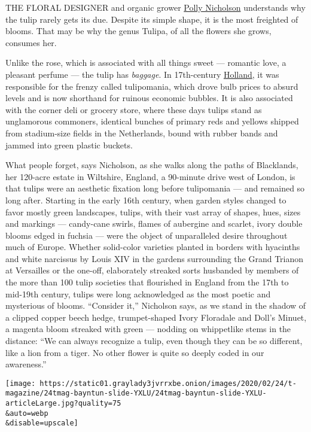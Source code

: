 THE FLORAL DESIGNER and organic grower
\href{https://www.bayntunflowers.co.uk/pages/polly-nicholson}{Polly
Nicholson} understands why the tulip rarely gets its due. Despite its
simple shape, it is the most freighted of blooms. That may be why the
genus Tulipa, of all the flowers she grows, consumes her.

Unlike the rose, which is associated with all things sweet --- romantic
love, a pleasant perfume --- the tulip has \emph{baggage}. In
17th-century
\href{https://www.nytimes3xbfgragh.onion/2007/05/13/travel/09tulipswebonly2.html}{Holland},
it was responsible for the frenzy called tulipomania, which drove bulb
prices to absurd levels and is now shorthand for ruinous economic
bubbles. It is also associated with the corner deli or grocery store,
where these days tulips stand as unglamorous commoners, identical
bunches of primary reds and yellows shipped from stadium-size fields in
the Netherlands, bound with rubber bands and jammed into green plastic
buckets.

What people forget, says Nicholson, as she walks along the paths of
Blacklands, her 120-acre estate in Wiltshire, England, a 90-minute drive
west of London, is that tulips were an aesthetic fixation long before
tulipomania --- and remained so long after. Starting in the early 16th
century, when garden styles changed to favor mostly green landscapes,
tulips, with their vast array of shapes, hues, sizes and markings ---
candy-cane swirls, flames of aubergine and scarlet, ivory double blooms
edged in fuchsia --- were the object of unparalleled desire throughout
much of Europe. Whether solid-color varieties planted in borders with
hyacinths and white narcissus by Louis XIV in the gardens surrounding
the Grand Trianon at Versailles or the one-off, elaborately streaked
sorts husbanded by members of the more than 100 tulip societies that
flourished in England from the 17th to mid-19th century, tulips were
long acknowledged as the most poetic and mysterious of blooms.
``Consider it,'' Nicholson says, as we stand in the shadow of a clipped
copper beech hedge, trumpet-shaped Ivory Floradale and Doll's Minuet, a
magenta bloom streaked with green --- nodding on whippetlike stems in
the distance: ``We can always recognize a tulip, even though they can be
so different, like a lion from a tiger. No other flower is quite so
deeply coded in our awareness.''

\texttt{[image: https://static01.graylady3jvrrxbe.onion/images/2020/02/24/t-magazine/24tmag-bayntun-slide-YXLU/24tmag-bayntun-slide-YXLU-articleLarge.jpg?quality=75\\\&auto=webp\\\&disable=upscale]}

